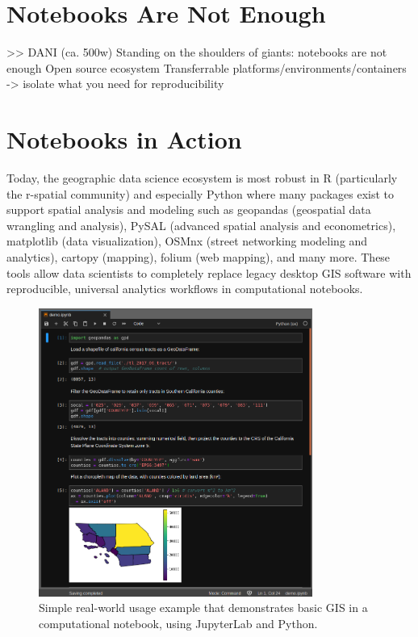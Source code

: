 \documentclass[11pt,letterpaper]{article}
\begin{document}
\section{Notebooks Are Not Enough}

>> DANI
(ca. 500w)
Standing on the shoulders of giants: notebooks are not enough
Open source ecosystem
Transferrable platforms/environments/containers -> isolate what you need for reproducibility

\section{Notebooks in Action}

Today, the geographic data science ecosystem is most robust in R (particularly the r-spatial community) and especially Python where many packages exist to support spatial analysis and modeling such as geopandas (geospatial data wrangling and analysis), PySAL (advanced spatial analysis and econometrics), matplotlib (data visualization), OSMnx (street networking modeling and analytics),  cartopy (mapping), folium (web mapping), and many more. These tools allow data scientists to completely replace legacy desktop GIS software with reproducible, universal analytics workflows in computational notebooks.

\begin{figure}[htb]
	\centering
	\includegraphics[width=0.8\textwidth]{code-demo.png}
	\caption{Simple real-world usage example that demonstrates basic GIS in a computational notebook, using JupyterLab and Python.}
	\label{fig:code_demo}
\end{figure}
\end{document}
